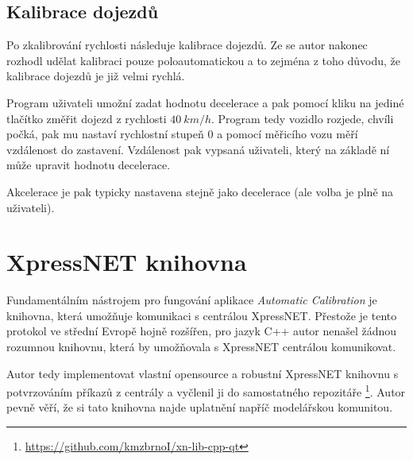 \subsection{Kalibrace dojezdů}

Po zkalibrování rychlosti následuje kalibrace dojezdů. Ze se autor nakonec
rozhodl udělat kalibraci pouze poloautomatickou a to zejména z toho důvodu,
že kalibrace dojezdů je již velmi rychlá.

Program uživateli umožní zadat hodnotu decelerace a pak pomocí kliku na jediné
tlačítko změřit dojezd z rychlosti $40\ km/h$. Program tedy vozidlo rozjede,
chvíli počká, pak mu nastaví rychlostní stupeň $0$ a pomocí měřicího vozu
měří vzdálenost do zastavení. Vzdálenost pak vypsaná uživateli, který na základě
ní může upravit hodnotu decelerace.

Akcelerace je pak typicky nastavena stejně jako decelerace (ale volba je plně
na uživateli).

\section{XpressNET knihovna}
\label{sec:xn-lib}

Fundamentálním nástrojem pro fungování aplikace \textit{Automatic Calibration}
je knihovna, která umožňuje komunikaci s centrálou XpressNET. Přestože je tento
protokol ve střední Evropě hojně rozšířen, pro jazyk C++ autor nenašel žádnou
rozumnou knihovnu, která by umožňovala s XpressNET centrálou komunikovat.

Autor tedy implementovat vlastní opensource a robustní XpressNET knihovnu
s potvrzováním příkazů z centrály a vyčlenil ji do samostatného repozitáře
\footnote{\url{https://github.com/kmzbrnoI/xn-lib-cpp-qt}}. Autor pevně věří, že si
tato knihovna najde uplatnění napříč modelářskou komunitou.
